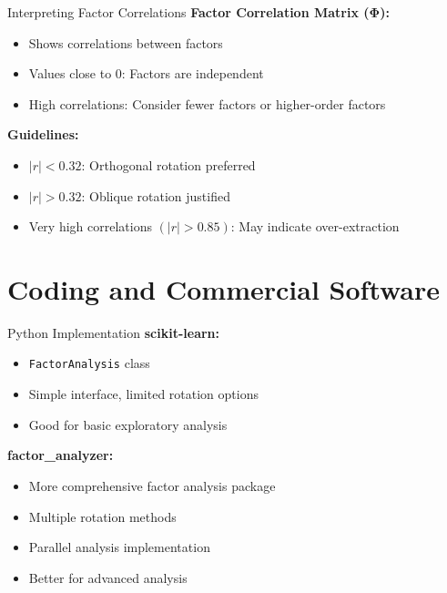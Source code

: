 \documentclass[aspectratio=169]{beamer}
\begin{document}
\begin{frame}{Interpreting Factor Correlations}
  \textbf{Factor Correlation Matrix ($\boldsymbol{\Phi}$):}
  \begin{itemize}
    \item Shows correlations between factors
    \item Values close to 0: Factors are independent
    \item High correlations: Consider fewer factors or higher-order factors
  \end{itemize}
  
  \textbf{Guidelines:}
  \begin{itemize}
    \item $|r| < 0.32$: Orthogonal rotation preferred
    \item $|r| > 0.32$: Oblique rotation justified
    \item Very high correlations $(|r| > 0.85)$: May indicate over-extraction
  \end{itemize}
\end{frame}


\section{Coding and Commercial Software}
\begin{frame}
  \sectionpage
\end{frame}

\begin{frame}{Python Implementation}
  \textbf{scikit-learn:}
  \begin{itemize}
    \item \texttt{FactorAnalysis} class
    \item Simple interface, limited rotation options
    \item Good for basic exploratory analysis
  \end{itemize}
  
  \textbf{factor\_analyzer:}
  \begin{itemize}
    \item More comprehensive factor analysis package
    \item Multiple rotation methods
    \item Parallel analysis implementation
    \item Better for advanced analysis
  \end{itemize}
\end{frame}
\end{document}
